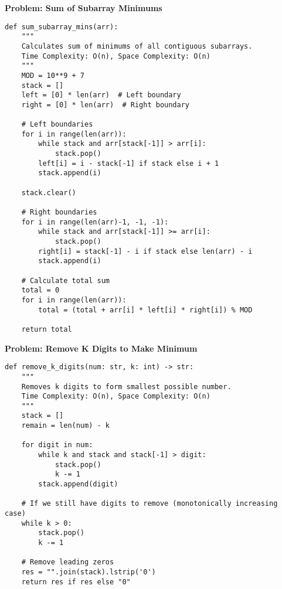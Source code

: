 \noindent\textbf{Problem: Sum of Subarray Minimums}
\begin{verbatim}
def sum_subarray_mins(arr):
    """
    Calculates sum of minimums of all contiguous subarrays.
    Time Complexity: O(n), Space Complexity: O(n)
    """
    MOD = 10**9 + 7
    stack = []
    left = [0] * len(arr)  # Left boundary
    right = [0] * len(arr)  # Right boundary

    # Left boundaries
    for i in range(len(arr)):
        while stack and arr[stack[-1]] > arr[i]:
            stack.pop()
        left[i] = i - stack[-1] if stack else i + 1
        stack.append(i)
    
    stack.clear()
    
    # Right boundaries
    for i in range(len(arr)-1, -1, -1):
        while stack and arr[stack[-1]] >= arr[i]:
            stack.pop()
        right[i] = stack[-1] - i if stack else len(arr) - i
        stack.append(i)
    
    # Calculate total sum
    total = 0
    for i in range(len(arr)):
        total = (total + arr[i] * left[i] * right[i]) % MOD
        
    return total
\end{verbatim}

\noindent\textbf{Problem: Remove K Digits to Make Minimum}
\begin{verbatim}
def remove_k_digits(num: str, k: int) -> str:
    """
    Removes k digits to form smallest possible number.
    Time Complexity: O(n), Space Complexity: O(n)
    """
    stack = []
    remain = len(num) - k
    
    for digit in num:
        while k and stack and stack[-1] > digit:
            stack.pop()
            k -= 1
        stack.append(digit)
    
    # If we still have digits to remove (monotonically increasing case)
    while k > 0:
        stack.pop()
        k -= 1
    
    # Remove leading zeros
    res = "".join(stack).lstrip('0')
    return res if res else "0"
\end{verbatim}

